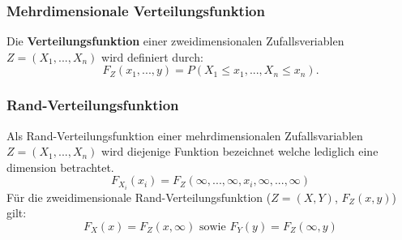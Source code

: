 \documentclass[12pt]{article}
\begin{document}
\subsubsection{Mehrdimensionale Verteilungsfunktion}
Die \textbf{Verteilungsfunktion} einer zweidimensionalen Zufallsveriablen $Z = (X_1,...,X_n)$ wird definiert durch:
\begin{equation*}
	F_Z(x_1,...,y)=P(X_1\leq x_1,..., X_n\leq x_n).
\end{equation*}
\subsubsection{Rand-Verteilungsfunktion}
Als Rand-Verteilungsfunktion einer mehrdimensionalen Zufallsvariablen $Z=(X_1,...,X_n)$ wird diejenige Funktion bezeichnet welche lediglich eine dimension betrachtet.
\begin{equation*}
	F_{X_i}(x_i)=F_Z(\infty,...,\infty,x_i,\infty,...,\infty)
\end{equation*}
Für die zweidimensionale Rand-Verteilungsfunktion ($Z=(X,Y)$, $F_Z(x,y)$) gilt:
\begin{equation*}
	F_X(x)=F_Z(x,\infty) \text{ sowie } F_Y(y) = F_Z(\infty,y)
\end{equation*}
\end{document}
